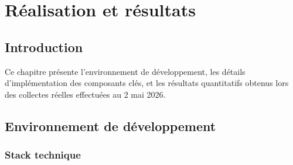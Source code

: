 \chapter{Réalisation et résultats}
\setcounter{chapter}{4}
\setcounter{section}{0}
\minitoc
\newpage

\section{Introduction}

Ce chapitre présente l'environnement de développement, les détails
d'implémentation des composants clés, et les résultats quantitatifs obtenus
lors des collectes réelles effectuées au 2 mai 2026.

\section{Environnement de développement}

\subsection{Stack technique}

